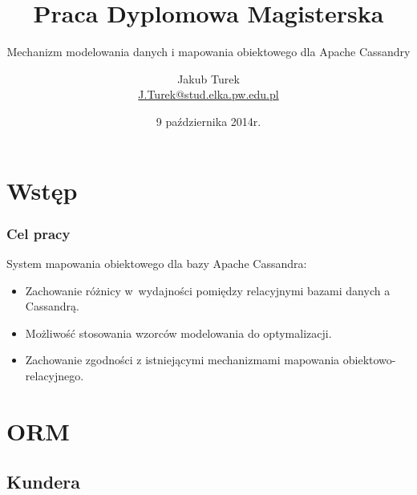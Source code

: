 \documentclass{beamer}
\title[Mechanizm modelowania danych i mapowania obiektowego dla Apache Cassandry]{Praca Dyplomowa Magisterska}
\subtitle{Mechanizm modelowania danych i mapowania obiektowego dla Apache Cassandry}
\author[Jakub Turek]{Jakub Turek \\ {\small \href{mailto:J.Turek@stud.elka.pw.edu.pl}{J.Turek@stud.elka.pw.edu.pl}}}
\date{9 października 2014r.}
\begin{document}
	\titlepage

	\section{Wstęp}

	\begin{frame}
		\frametitle{Cel pracy}

		System mapowania obiektowego dla bazy Apache Cassandra:

		\begin{itemize}
			\item Zachowanie różnicy w~wydajności pomiędzy relacyjnymi bazami danych a Cassandrą.
			\item Możliwość stosowania wzorców modelowania do optymalizacji.
			\item Zachowanie zgodności z istniejącymi mechanizmami mapowania obiektowo-relacyjnego.
		\end{itemize}
	\end{frame}

	\section{ORM}
	\subsection{Kundera}
\end{document}

